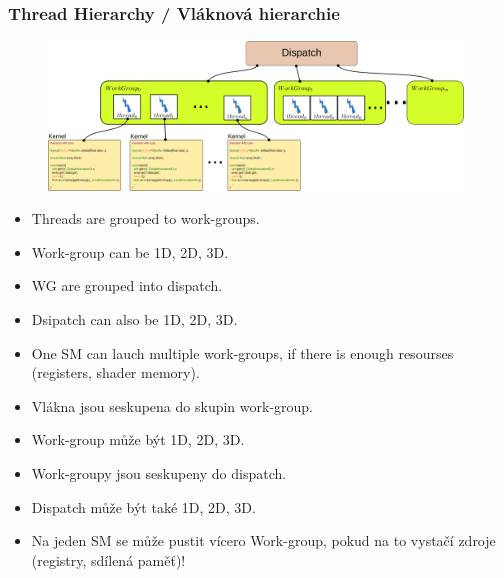 \begin{frame}
  \frametitle{Thread Hierarchy / Vláknová hierarchie}
  \begin{figure}[h]
	\includegraphics[width=11cm,keepaspectratio]{pics/gpu/thread_hierarchy}
	\end{figure}
  \scriptsize

  \begin{itemize}
    \item Threads are grouped to work-groups.
    \item Work-group can be 1D, 2D, 3D.
    \item WG are grouped into dispatch.
    \item Dsipatch can also be 1D, 2D, 3D.
    \item One SM can lauch multiple work-groups, if there is enough resourses (registers, shader memory).
  \end{itemize}

  \begin{itemize}
    \item Vlákna jsou seskupena do skupin work-group.
    \item Work-group může být 1D, 2D, 3D.
    \item Work-groupy jsou seskupeny do dispatch.
    \item Dispatch může být také 1D, 2D, 3D.
    \item Na jeden SM se může pustit vícero Work-group, pokud na to vystačí zdroje (registry, sdílená paměť)!
  \end{itemize}
\end{frame}

